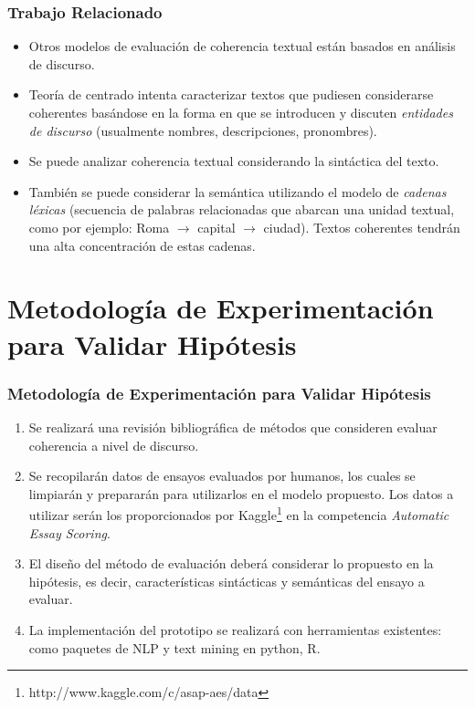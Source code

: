 \documentclass{beamer}
\begin{document}
\begin{frame}
\frametitle{Trabajo Relacionado}

\begin{itemize}
	\item Otros modelos de evaluación de coherencia textual están basados en análisis de discurso.
	\item Teoría de centrado intenta caracterizar textos que pudiesen considerarse coherentes basándose en la forma en que se introducen y discuten {\em entidades de discurso} (usualmente nombres, descripciones, pronombres).
	\item Se puede analizar coherencia textual considerando la sintáctica del texto.
	\item También se puede considerar la semántica utilizando el modelo de {\em cadenas léxicas} (secuencia de palabras relacionadas que abarcan una unidad textual, como por ejemplo: Roma $\rightarrow$ capital $\rightarrow$ ciudad). Textos coherentes tendrán una alta concentración de estas cadenas.
\end{itemize}

\end{frame}

\section{Metodología de Experimentación para Validar Hipótesis}
\begin{frame}
\frametitle{Metodología de Experimentación para Validar Hipótesis}
\begin{enumerate}
\item Se realizará una revisión bibliográfica de métodos que consideren evaluar coherencia a nivel
de discurso.
\item Se recopilarán datos de ensayos evaluados por humanos, los cuales se limpiarán y prepararán
para utilizarlos en el modelo propuesto. Los datos a utilizar serán los proporcionados por Kaggle\footnote{http://www.kaggle.com/c/asap-aes/data} en la competencia {\em Automatic Essay Scoring}.
\item El diseño del método de evaluación deberá considerar lo propuesto en la hipótesis, es
decir, características sintácticas y semánticas del ensayo a evaluar.
\item La implementación del prototipo se realizará con herramientas existentes: como paquetes de NLP y text mining en python, R.
\end{enumerate}

\end{frame}
\end{document}
